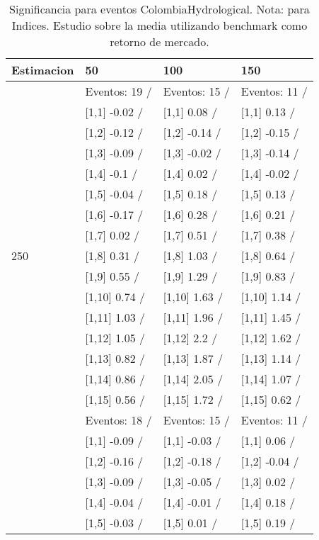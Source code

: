 \begin{table}

\caption{Significancia para eventos ColombiaHydrological. Nota: para Indices. Estudio sobre la media utilizando benchmark como retorno de mercado.}
\centering
\begin{tabular}[t]{llll}
\toprule
Estimacion & 50 & 100 & 150\\
\midrule
 & Eventos:  19 / & Eventos:  15 / & Eventos:  11 /\\
 & {}[1,1] -0.02  / & {}[1,1] 0.08  / & {}[1,1] 0.13  /\\
 & {}[1,2] -0.12  / & {}[1,2] -0.14  / & {}[1,2] -0.15  /\\
 & {}[1,3] -0.09  / & {}[1,3] -0.02  / & {}[1,3] -0.14  /\\
 & {}[1,4] -0.1  / & {}[1,4] 0.02  / & {}[1,4] -0.02  /\\
\addlinespace
 & {}[1,5] -0.04  / & {}[1,5] 0.18  / & {}[1,5] 0.13  /\\
 & {}[1,6] -0.17  / & {}[1,6] 0.28  / & {}[1,6] 0.21  /\\
 & {}[1,7] 0.02  / & {}[1,7] 0.51  / & {}[1,7] 0.38  /\\
250 & {}[1,8] 0.31  / & {}[1,8] 1.03  / & {}[1,8] 0.64  /\\
 & {}[1,9] 0.55  / & {}[1,9] 1.29  / & {}[1,9] 0.83  /\\
\addlinespace
 & {}[1,10] 0.74  / & {}[1,10] 1.63  / & {}[1,10] 1.14  /\\
 & {}[1,11] 1.03  / & {}[1,11] 1.96  / & {}[1,11] 1.45  /\\
 & {}[1,12] 1.05  / & {}[1,12] 2.2  / & {}[1,12] 1.62  /\\
 & {}[1,13] 0.82  / & {}[1,13] 1.87  / & {}[1,13] 1.14  /\\
 & {}[1,14] 0.86  / & {}[1,14] 2.05  / & {}[1,14] 1.07  /\\
\addlinespace
 & {}[1,15] 0.56  / & {}[1,15] 1.72  / & {}[1,15] 0.62  /\\
 & Eventos:  18 / & Eventos:  15 / & Eventos:  11 /\\
 & {}[1,1] -0.09  / & {}[1,1] -0.03  / & {}[1,1] 0.06  /\\
 & {}[1,2] -0.16  / & {}[1,2] -0.18  / & {}[1,2] -0.04  /\\
 & {}[1,3] -0.09  / & {}[1,3] -0.05  / & {}[1,3] 0.02  /\\
\addlinespace
 & {}[1,4] -0.04  / & {}[1,4] -0.01  / & {}[1,4] 0.18  /\\
 & {}[1,5] -0.03  / & {}[1,5] 0.01  / & {}[1,5] 0.19  /\\

\end{tabular}
\end{table}
